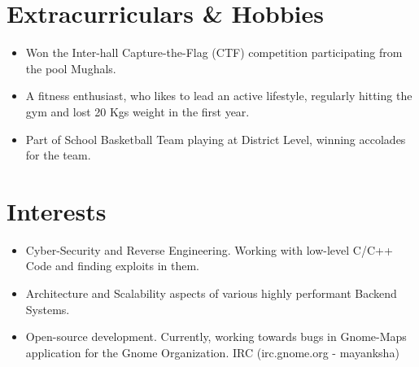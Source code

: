 \documentclass[a4paper,20pt]{article}
\newcommand{\resumeSubHeadingListStart}{\begin{itemize}[leftmargin=*]}
\newcommand{\resumeSubHeadingListEnd}{\end{itemize}}
\begin{document}
\vspace{-0.6cm}

\section{Extracurriculars \& Hobbies}
\begin{itemize}
	\setlength\itemsep{0pt}
	\item \fontsize{10pt}{1em} Won the Inter-hall Capture-the-Flag (CTF) competition participating from the pool Mughals.
	\item	A fitness enthusiast, who likes to lead an active lifestyle, regularly hitting the gym and lost 20 Kgs weight in the first year. 
	\item Part of School Basketball Team playing at District Level, winning accolades for the team.
\end{itemize}

\section{Interests}
\begin{itemize}
	\setlength\itemsep{0pt}
	\item Cyber-Security and Reverse Engineering. Working with low-level C/C++ Code and finding exploits in them. 
	\item Architecture and Scalability aspects of various highly performant Backend Systems.	
	\item Open-source development. Currently, working towards bugs in Gnome-Maps application for the Gnome Organization. IRC (irc.gnome.org - mayanksha)
\end{itemize}
%


\end{document}
